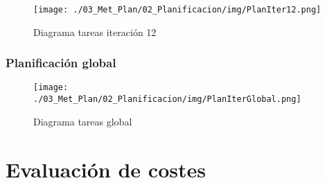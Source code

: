 \begin{figure}[H]
\vspace{-1cm}
\texttt{[image: ./03\_Met\_Plan/02\_Planificacion/img/PlanIter12.png]}
\caption{Diagrama tareas iteración 12}
\end{figure}


\subsubsection*{Planificación global}

\begin{figure}[H]
\vspace{-0.5cm}
\texttt{[image: ./03\_Met\_Plan/02\_Planificacion/img/PlanIterGlobal.png]}
\caption{Diagrama tareas global}
\end{figure}


\section{Evaluación de costes}


